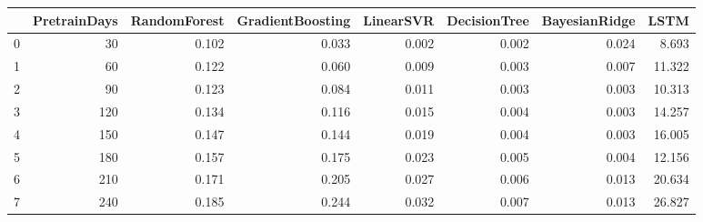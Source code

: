 \begin{tabular}{lrrrrrrr}
\toprule
{} &  PretrainDays &  RandomForest &  GradientBoosting &  LinearSVR &  DecisionTree &  BayesianRidge &   LSTM \\
\midrule
0 &            30 &         0.102 &             0.033 &      0.002 &         0.002 &          0.024 &  8.693 \\
1 &            60 &         0.122 &             0.060 &      0.009 &         0.003 &          0.007 & 11.322 \\
2 &            90 &         0.123 &             0.084 &      0.011 &         0.003 &          0.003 & 10.313 \\
3 &           120 &         0.134 &             0.116 &      0.015 &         0.004 &          0.003 & 14.257 \\
4 &           150 &         0.147 &             0.144 &      0.019 &         0.004 &          0.003 & 16.005 \\
5 &           180 &         0.157 &             0.175 &      0.023 &         0.005 &          0.004 & 12.156 \\
6 &           210 &         0.171 &             0.205 &      0.027 &         0.006 &          0.013 & 20.634 \\
7 &           240 &         0.185 &             0.244 &      0.032 &         0.007 &          0.013 & 26.827 \\
\bottomrule
\end{tabular}
